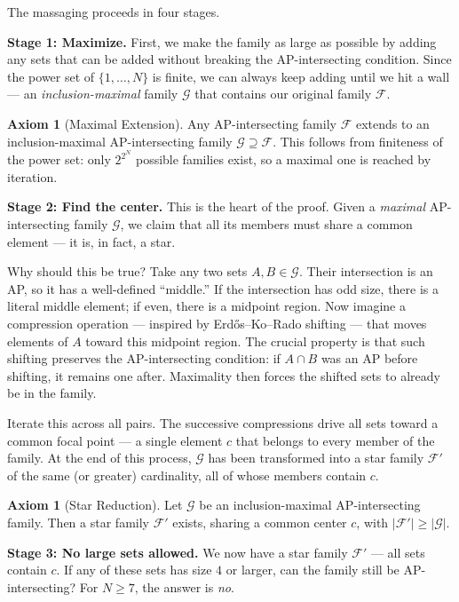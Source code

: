 \documentclass[11pt,a4paper]{article}
\theoremstyle{definition}
\newtheorem{axiom}[theorem]{Axiom}
\newcommand{\ground}{\{1,\dots,N\}}
\begin{document}
The massaging proceeds in four stages.

\medskip\noindent
\textbf{Stage 1: Maximize.} First, we make the family as large as possible by
adding any sets that can be added without breaking the AP-intersecting condition.
Since the power set of $\ground$ is finite, we can always keep adding until we hit a
wall --- an \emph{inclusion-maximal} family $\mathcal{G}$ that contains our original
family $\mathcal{F}$.

\begin{axiom}[Maximal Extension]\label{ax:maxext}
Any AP-intersecting family $\mathcal{F}$ extends to an inclusion-maximal
AP-intersecting family $\mathcal{G} \supseteq \mathcal{F}$. This follows from
finiteness of the power set: only $2^{2^N}$ possible families exist, so a
maximal one is reached by iteration.
\end{axiom}

\medskip\noindent
\textbf{Stage 2: Find the center.} This is the heart of the proof. Given a
\emph{maximal} AP-intersecting family $\mathcal{G}$, we claim that all its members
must share a common element --- it is, in fact, a star.

Why should this be true? Take any two sets $A, B \in \mathcal{G}$. Their
intersection is an AP, so it has a well-defined ``middle.'' If the intersection has
odd size, there is a literal middle element; if even, there is a midpoint region.
Now imagine a compression operation --- inspired by Erd\H{o}s--Ko--Rado shifting ---
that moves elements of $A$ toward this midpoint region. The crucial property is that
such shifting preserves the AP-intersecting condition: if $A \cap B$ was an AP before
shifting, it remains one after. Maximality then forces the shifted sets to already be
in the family.

Iterate this across all pairs. The successive compressions drive all sets toward a
common focal point --- a single element $c$ that belongs to every member of the
family. At the end of this process, $\mathcal{G}$ has been transformed into a star
family $\mathcal{F}'$ of the same (or greater) cardinality, all of whose members
contain $c$.

\begin{axiom}[Star Reduction]\label{ax:starred}
Let $\mathcal{G}$ be an inclusion-maximal AP-intersecting family.
Then a star family $\mathcal{F}'$ exists, sharing a common center $c$,
with $|\mathcal{F}'| \geq |\mathcal{G}|$.
\end{axiom}

\medskip\noindent
\textbf{Stage 3: No large sets allowed.} We now have a star family $\mathcal{F}'$ ---
all sets contain $c$. If any of these sets has size $4$ or larger, can the family
still be AP-intersecting? For $N \geq 7$, the answer is \emph{no}.
\end{document}
